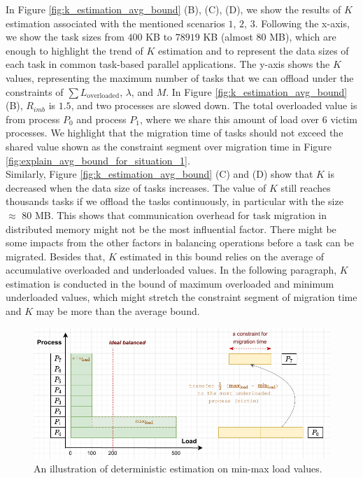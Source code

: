 In Figure \ref{fig:k_estimation_avg_bound} (B), (C), (D), we show the results of $K$ estimation associated with the mentioned scenarios $1$, $2$, $3$. Following the x-axis, we show the task sizes from $400$ KB to $78919$ KB (almost $80$ MB), which are enough to highlight the trend of $K$ estimation and to represent the data sizes of each task in common task-based parallel applications. The y-axis shows the $K$ values, representing the maximum number of tasks that we can offload under the constraints of $\sum L_{\text{overloaded}}$, $\lambda$, and $M$. In Figure \ref{fig:k_estimation_avg_bound} (B), $R_{imb}$ is $1.5$, and two processes are slowed down. The total overloaded value is from process $P_{0}$ and process $P_{1}$, where we share this amount of load over $6$ victim processes. We highlight that the migration time of tasks should not exceed the shared value shown as the constraint segment over migration time in Figure \ref{fig:explain_avg_bound_for_situation_1}.\\

Similarly, Figure \ref{fig:k_estimation_avg_bound} (C) and (D) show that $K$ is decreased when the data size of tasks increases. The value of $K$ still reaches thousands tasks if we offload the tasks continuously, in particular with the size $\approx$ $80$ MB. This shows that communication overhead for task migration in distributed memory might not be the most influential factor. There might be some impacts from the other factors in balancing operations before a task can be migrated. Besides that, $K$ estimated in this bound relies on the average of accumulative overloaded and underloaded values. In the following paragraph, $K$ estimation is conducted in the bound of maximum overloaded and minimum underloaded values, which might stretch the constraint segment of migration time and $K$ may be more than the average bound. \\

\begin{figure}[t]
  \centering
  \includegraphics[scale=0.65]{./pictures/perf_analysis_model/perf_analysis_minmax_bound_principle_case_1.5_two_sld_procs.pdf}
	\caption{An illustration of deterministic estimation on min-max load values.}
	\label{fig:explain_minmax_bound_for_situation_1}
\end{figure}

